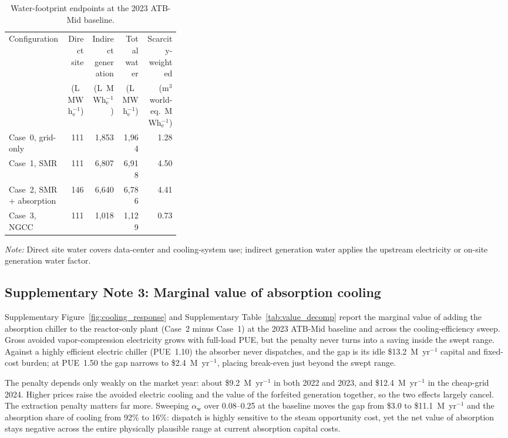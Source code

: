 \documentclass[a4paper,fleqn]{cas-sc}
\begin{document}
\begin{table}[pos=t]
\centering
\caption{Water-footprint endpoints at the 2023 ATB-Mid baseline.}
\label{tab:secondary_kpis_water}
\renewcommand{\arraystretch}{1.08}
\small
\begin{tabularx}{\linewidth}{@{}P{0.34\linewidth}*{4}{N}@{}}
\toprule
Configuration & Direct site & Indirect generation & Total water & Scarcity-weighted \\
              & (L~MWh$_\mathrm{e}^{-1}$) & (L~MWh$_\mathrm{e}^{-1}$) & (L~MWh$_\mathrm{e}^{-1}$) & (m$^3$ world-eq.~MWh$_\mathrm{e}^{-1}$) \\
\midrule
Case~0, grid-only        & 111 & 1{,}853 & 1{,}964 & 1.28 \\
Case~1, SMR              & 111 & 6{,}807 & 6{,}918 & 4.50 \\
Case~2, SMR + absorption & 146 & 6{,}640 & 6{,}786 & 4.41 \\
Case~3, NGCC             & 111 & 1{,}018 & 1{,}129 & 0.73 \\
\bottomrule
\end{tabularx}
\begin{flushleft}
\footnotesize \textit{Note:} Direct site water covers data-center and cooling-system use; indirect generation water applies the upstream electricity or on-site generation water factor.
\end{flushleft}
\end{table}

\subsection*{Supplementary Note 3: Marginal value of absorption cooling}\label{note:absvalue}
Supplementary Figure~\ref{fig:cooling_response} and Supplementary Table~\ref{tab:value_decomp} report the marginal value of adding the absorption chiller to the reactor-only plant (Case~2 minus Case~1) at the 2023 ATB-Mid baseline and across the cooling-efficiency sweep. Gross avoided vapor-compression electricity grows with full-load PUE, but the penalty never turns into a saving inside the swept range. Against a highly efficient electric chiller (PUE~1.10) the absorber never dispatches, and the gap is its idle \$13.2~M~yr$^{-1}$ capital and fixed-cost burden; at PUE~1.50 the gap narrows to \$2.4~M~yr$^{-1}$, placing break-even just beyond the swept range.

The penalty depends only weakly on the market year: about \$9.2~M~yr$^{-1}$ in both 2022 and 2023, and \$12.4~M~yr$^{-1}$ in the cheap-grid 2024. Higher prices raise the avoided electric cooling and the value of the forfeited generation together, so the two effects largely cancel. The extraction penalty matters far more. Sweeping $\alpha_\mathrm{w}$ over 0.08--0.25 at the baseline moves the gap from \$3.0 to \$11.1~M~yr$^{-1}$ and the absorption share of cooling from 92\% to 16\%: dispatch is highly sensitive to the steam opportunity cost, yet the net value of absorption stays negative across the entire physically plausible range at current absorption capital costs.
\end{document}
